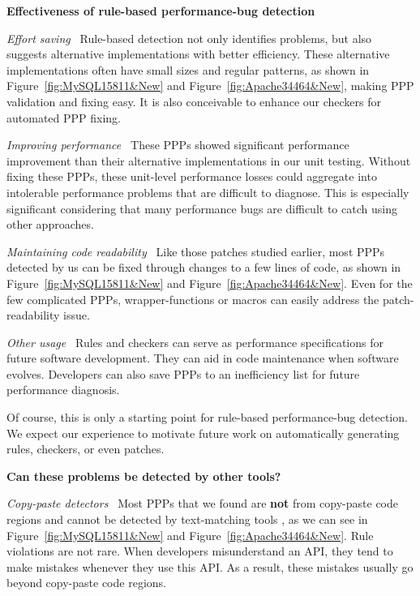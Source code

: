 {\bf Effectiveness of rule-based performance-bug detection\ }

{\it Effort saving\ } Rule-based detection not only identifies problems, but
also suggests alternative implementations with better efficiency.
These alternative implementations often
have small sizes and regular patterns,
as shown in Figure~\ref{fig:MySQL15811&New} and Figure~\ref{fig:Apache34464&New}, 
making PPP validation and fixing easy.
It is also conceivable to enhance our checkers for automated PPP fixing. 

{\it Improving performance\ }
These PPPs showed 
significant performance improvement than their alternative implementations
in our unit testing. Without fixing these PPPs,
these unit-level performance losses could aggregate into intolerable
performance problems that are difficult to diagnose. 
This is especially significant considering that many performance bugs are
difficult to catch using other approaches.


{\it Maintaining code readability\ }
Like those \allbugs patches studied earlier, 
most PPPs detected by us can be fixed through changes to a few lines of code,
as shown in Figure~\ref{fig:MySQL15811&New} and Figure~\ref{fig:Apache34464&New}.
Even for the few complicated PPPs, wrapper-functions or 
macros can easily address the patch-readability issue.

{\it Other usage\ }
Rules and checkers can serve as performance specifications for future 
software
development. They can aid in code maintenance when software evolves.
Developers can also save PPPs to an inefficiency list for future performance 
diagnosis.

Of course, this is only a starting point for rule-based performance-bug
detection. We expect our experience to motivate future work on 
automatically generating rules, checkers, or even patches.


{\bf Can these problems be detected by other tools?\ }

{\it Copy-paste detectors\ } 
Most PPPs that we found are {\bf not} from copy-paste code regions
 and cannot be detected by text-matching tools
\citep{zhendong.oopsla10,CPMiner04}, as we can see in
Figure~\ref{fig:MySQL15811&New} and Figure~\ref{fig:Apache34464&New}. Rule violations are not rare.
When developers misunderstand an API,
they tend to make mistakes whenever they use this API.
As a result, these mistakes usually go beyond
copy-paste code regions.

